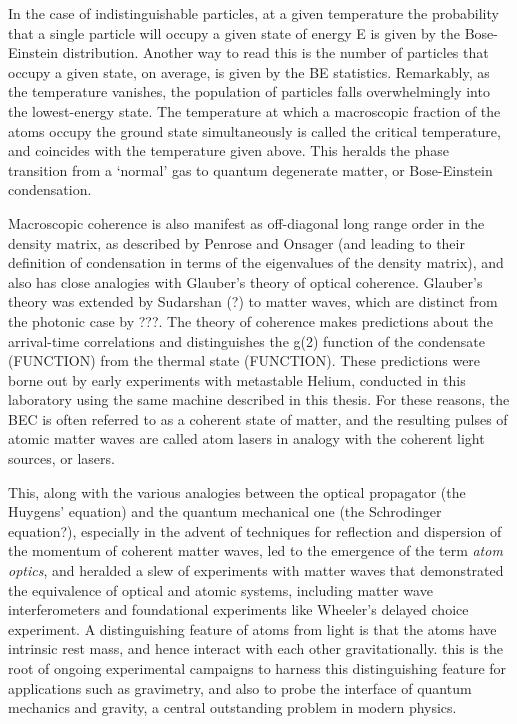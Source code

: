 	In the case of indistinguishable particles, at a given temperature the	probability that a single particle will occupy a given state of energy E	is given by the Bose-Einstein distribution. Another way to read this is	the number of particles that occupy a given state, on average, is given	by the BE statistics. Remarkably, as the temperature vanishes, the	population of particles falls overwhelmingly into the lowest-energy	state. The temperature at which a macroscopic fraction of the atoms	occupy the ground state simultaneously is called the critical	temperature, and coincides with the temperature given above. This	heralds the phase transition from a `normal' gas to quantum degenerate	matter, or Bose-Einstein condensation.

	Macroscopic coherence is also manifest as off-diagonal long range order	in the density matrix, as described by Penrose and Onsager (and leading	to their definition of condensation in terms of the eigenvalues of the	density matrix), and also has close analogies with Glauber's theory of	optical coherence. Glauber's theory was extended by Sudarshan (?) to	matter waves, which are distinct from the photonic case by ???. The	theory of coherence makes predictions about the arrival-time	correlations and distinguishes the g(2) function of the condensate	(FUNCTION) from the thermal state (FUNCTION). These predictions were	borne out by early experiments with metastable Helium, conducted in this	laboratory using the same machine described in this thesis. For these	reasons, the BEC is often referred to as a coherent state of matter, and	the resulting pulses of atomic matter waves are called atom lasers in	analogy with the coherent light sources, or lasers.

	This, along with the various analogies between the optical propagator	(the Huygens' equation) and the quantum mechanical one (the Schrodinger	equation?), especially in the advent of techniques for reflection and	dispersion of the momentum of coherent matter waves, led to the	emergence of the term \emph{atom optics}, and heralded a slew of	experiments with matter waves that demonstrated the equivalence of	optical and atomic systems, including matter wave interferometers and	foundational experiments like Wheeler's delayed choice experiment. A	distinguishing feature of atoms from light is that the atoms have	intrinsic rest mass, and hence interact with each other gravitationally.	this is the root of ongoing experimental campaigns to harness this	distinguishing feature for applications such as gravimetry, and also to	probe the interface of quantum mechanics and gravity, a central	outstanding problem in modern physics.

